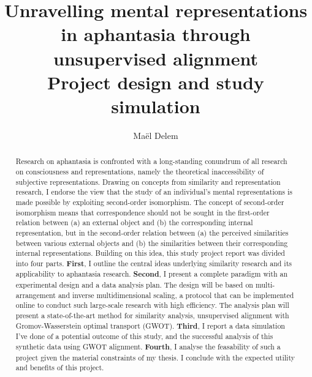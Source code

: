 \documentclass[
  authoryear]{elsarticle}
\renewcommand*\contentsname{Table of contents}
\newcommand\contentsname{Table of contents}
\begin{document}
\begin{frontmatter}
\title{Unravelling mental representations in aphantasia through
unsupervised alignment \\\large{Project design and study simulation} }
\author[]{Maël Delem%
%
}


        
\begin{abstract}
Research on aphantasia is confronted with a long-standing conundrum of
all research on consciousness and representations, namely the
theoretical inaccessibility of subjective representations. Drawing on
concepts from similarity and representation research, I endorse the view
that the study of an individual's mental representations is made
possible by exploiting second-order isomorphism. The concept of
second-order isomorphism means that correspondence should not be sought
in the first-order relation between (a) an external object and (b) the
corresponding internal representation, but in the second-order relation
between (a) the perceived similarities between various external objects
and (b) the similarities between their corresponding internal
representations. Building on this idea, this study project report was
divided into four parts. \textbf{First}, I outline the central ideas
underlying similarity research and its applicability to aphantasia
research. \textbf{Second}, I present a complete paradigm with an
experimental design and a data analysis plan. The design will be based
on multi-arrangement and inverse multidimensional scaling, a protocol
that can be implemented online to conduct such large-scale research with
high efficiency. The analysis plan will present a state-of-the-art
method for similarity analysis, unsupervised alignment with
Gromov-Wasserstein optimal transport (GWOT). \textbf{Third}, I report a
data simulation I've done of a potential outcome of this study, and the
successful analysis of this synthetic data using GWOT alignment.
\textbf{Fourth}, I analyse the feasability of such a project given the
material constraints of my thesis. I conclude with the expected utility
and benefits of this project.
\end{abstract}





\end{frontmatter}
    
\renewcommand*\contentsname{Table of contents}
{
\hypersetup{linkcolor=}
\setcounter{tocdepth}{2}
\tableofcontents
}
\newpage
\end{document}
